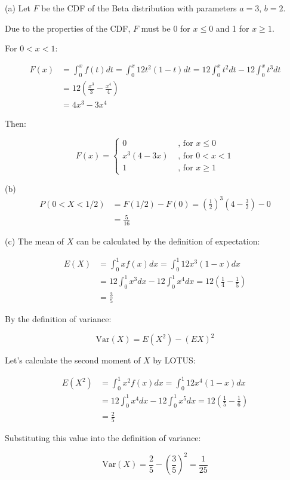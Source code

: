 (a)
Let $F$ be the CDF of the Beta distribution with parameters $a=3$, $b=2$.

Due to the properties of the CDF, $F$ must be 0 for $x \le 0$ and 1 for $x \ge 1$.

For $0 < x < 1$:

\begin{equation*}
\begin{split}
F(x)
& = \int_0^x f(t) dt = \int_0^x 12 t^2 (1-t) dt = 12 \int_0^x t^2 dt - 12 \int_0^x t^3 dt \\
& = 12 \left( \frac{x^3}{3} - \frac{x^4}{4} \right) \\
& = 4 x^3 - 3 x^4
\end{split}
\end{equation*}

Then:

$$
F(x) =
\begin{cases}
0           &\text{ , for } x \le 0 \\
x^3(4 - 3x) &\text{ , for } 0 < x < 1 \\
1           &\text{ , for } x \ge 1
\end{cases}
$$


(b)
\begin{equation*}
\begin{split}
P(0 < X < 1/2)
& = F(1/2) - F(0) = \left( \frac{1}{2} \right)^3 \left( 4 - \frac{3}{2} \right) - 0 \\
& = \frac{5}{16}
\end{split}
\end{equation*}


(c)
The mean of $X$ can be calculated by the definition of expectation:

\begin{equation*}
\begin{split}
E(X)
& = \int_0^1 x f(x) dx = \int_0^1 12 x^3 (1-x) dx \\
& = 12 \int_0^1 x^3 dx - 12 \int_0^1 x^4 dx = 12 \left( \frac{1}{4} - \frac{1}{5} \right) \\
& = \frac{3}{5}
\end{split}
\end{equation*}


By the definition of variance:

$$
\mathrm{Var}(X) = E(X^2) - (EX)^2
$$

Let's calculate the second moment of $X$ by LOTUS:

\begin{equation*}
\begin{split}
E(X^2)
& = \int_0^1 x^2 f(x) dx = \int_0^1 12 x^4 (1 - x) dx \\
& = 12 \int_0^1 x^4 dx - 12 \int_0^1 x^5 dx = 12 \left( \frac{1}{5} - \frac{1}{6} \right) \\
& = \frac{2}{5}
\end{split}
\end{equation*}


Substituting this value into the definition of variance:

$$
\mathrm{Var}(X) = \frac{2}{5} - \left( \frac{3}{5} \right)^2 = \frac{1}{25}
$$
